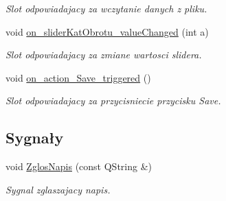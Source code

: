 \begin{DoxyCompactItemize}
\begin{DoxyCompactList}\small\item\em Slot odpowiadajacy za wczytanie danych z pliku. \end{DoxyCompactList}\item 
void \hyperlink{class_okno_glowne_a13edcaa9e3c75c793db2b147b2ffd12b}{on\-\_\-slider\-Kat\-Obrotu\-\_\-value\-Changed} (int a)
\begin{DoxyCompactList}\small\item\em Slot odpowiadajacy za zmiane wartosci slidera. \end{DoxyCompactList}\item 
void \hyperlink{class_okno_glowne_a8ed8fc49c9c3d3e187639880ce286c88}{on\-\_\-action\-\_\-\-Save\-\_\-triggered} ()
\begin{DoxyCompactList}\small\item\em Slot odpowiadajacy za przycisniecie przycisku Save. \end{DoxyCompactList}\end{DoxyCompactItemize}
\subsection*{Sygnały}
\begin{DoxyCompactItemize}
\item 
void \hyperlink{class_okno_glowne_aa602a0c5a940f0af4ab7390bfc1a4b9d}{Zglos\-Napis} (const Q\-String \&)
\begin{DoxyCompactList}\small\item\em Sygnal zglaszajacy napis. \end{DoxyCompactList}\end{DoxyCompactItemize}
